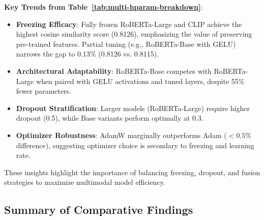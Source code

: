 \noindent \textbf{Key Trends from Table~\ref{tab:multi-hparam-breakdown}}:
\newline

\begin{itemize}
    \item \textbf{Freezing Efficacy}: Fully frozen RoBERTa-Large and CLIP achieve the highest cosine similarity score (0.8126), emphasizing the value of preserving pre-trained features. Partial tuning (e.g., RoBERTa-Base with GELU) narrows the gap to 0.13\% (0.8126 vs. 0.8115).
    \item \textbf{Architectural Adaptability}: RoBERTa-Base competes with RoBERTa-Large when paired with GELU activations and tuned layers, despite 55\% fewer parameters.
    \item \textbf{Dropout Stratification}: Larger models (RoBERTa-Large) require higher dropout (0.5), while Base variants perform optimally at 0.3.
    \item \textbf{Optimizer Robustness}: AdamW marginally outperforms Adam ($<0.5\%$ difference), suggesting optimizer choice is secondary to freezing and learning rate.
\end{itemize}

These insights highlight the importance of balancing freezing, dropout, and fusion strategies to maximize multimodal model efficiency.

\subsection{Summary of Comparative Findings}

